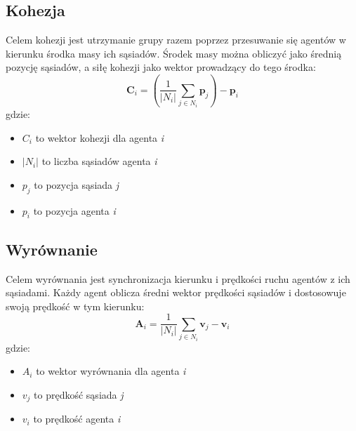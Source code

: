 \documentclass[a4paper,12pt]{article}
\begin{document}
\subsection{Kohezja}
Celem kohezji jest utrzymanie grupy razem poprzez przesuwanie się agentów w kierunku środka masy ich sąsiadów. Środek masy można obliczyć jako średnią pozycję sąsiadów, a siłę kohezji jako wektor prowadzący do tego środka:
\begin{equation}
    \mathbf{C}_i = \left( \frac{1}{|N_i|} \sum_{j \in N_i} \mathbf{p}_j \right) - \mathbf{p}_i
\end{equation}
gdzie:
\begin{itemize}
    \item $C_{i}$ to wektor kohezji dla agenta \textit{i}
    \item $|N_{i}|$ to liczba sąsiadów agenta \textit{i}
    \item $p_{j}$ to pozycja sąsiada \textit{j}
    \item $p_{i}$ to pozycja agenta \textit{i}
\end{itemize}

\subsection{Wyrównanie}
Celem wyrównania jest synchronizacja kierunku i prędkości ruchu agentów z ich sąsiadami. Każdy agent oblicza średni wektor prędkości sąsiadów i dostosowuje swoją prędkość w tym kierunku:
\begin{equation}
    \mathbf{A}_i = \frac{1}{|N_i|} \sum_{j \in N_i} \mathbf{v}_j - \mathbf{v}_i
\end{equation}
gdzie:
\begin{itemize}
    \item $A_{i}$ to wektor wyrównania dla agenta \textit{i}
    \item $v_{j}$ to prędkość sąsiada \textit{j}
    \item $v_{i}$ to prędkość agenta \textit{i}
\end{itemize}
\end{document}
